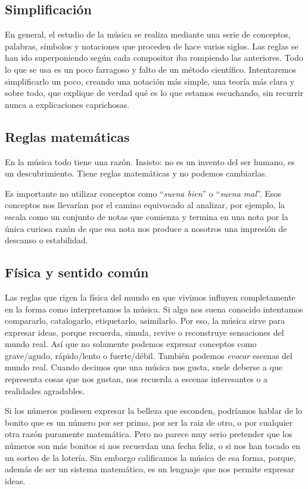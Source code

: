 \documentclass[]{article}
\begin{document}
\subsection{Simplificación}

En general, el estudio de la música se realiza mediante una serie de conceptos, palabras, símbolos y notaciones que proceden de hace varios siglos. Las reglas se han ido superponiendo según cada compositor iba rompiendo las anteriores. Todo lo que se usa es un poco farragoso y falto de un método científico. Intentaremos simplificarlo un poco, creando una notación más simple, una teoría más clara y sobre todo, que explique de verdad qué es lo que estamos escuchando, sin recurrir nunca a explicaciones caprichosas.

\subsection{Reglas matemáticas}

En la música todo tiene una razón. Insisto: no es un invento del ser humano, es un descubrimiento. Tiene reglas matemáticas y no podemos cambiarlas.

Es importante no utilizar conceptos como ``\emph{suena   bien}'' o ``\emph{suena mal}''. Esos conceptos nos llevarían por el camino equivocado al analizar, por ejemplo, la escala como un conjunto de notas que comienza y termina en una nota por la única curiosa razón de que esa nota nos produce a nosotros una impresión de descanso o estabilidad.

\subsection{Física y sentido común}

Las reglas que rigen la física del mundo en que vivimos influyen completamente en la forma como interpretamos la música. Si algo nos suena conocido intentamos compararlo, catalogarlo, etiquetarlo, asimilarlo. Por eso, la música sirve para expresar ideas, porque recuerda, simula, revive o reconstruye sensaciones del mundo real. Así que no solamente podemos expresar conceptos como grave/agudo, rápido/lento o fuerte/débil. También podemos \emph{evocar} escenas del mundo real. Cuando decimos que una música nos gusta, suele deberse a que representa cosas que nos gustan, nos recuerda a escenas interesantes o a realidades agradables.

Si los números pudiesen expresar la belleza que esconden, podríamos hablar de lo bonito que es un número por ser primo, por ser la raiz de otro, o por cualquier otra razón puramente matemática. Pero no parece muy serio pretender que los números son más bonitos si nos recuerdan una fecha feliz, o si nos han tocado en un sorteo de la lotería. Sin embargo calificamos la música de esa forma, porque, además de ser un sistema matemático, es un lenguaje que nos permite expresar ideas.
\end{document}
